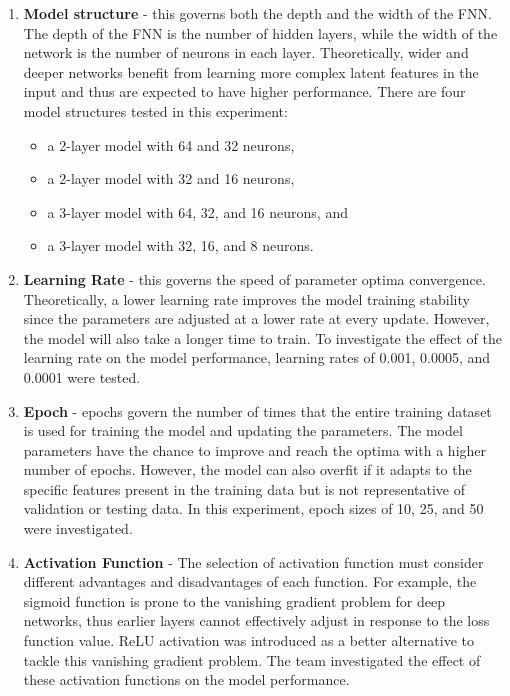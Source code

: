 \documentclass[a4paper]{article}
\begin{document}
\begin{enumerate}
    \item \textbf{Model structure} - this governs both the depth and the width of the FNN. The depth of the FNN is the number of hidden layers, while the width of the network is the number of neurons in each layer. Theoretically, wider and deeper networks benefit from learning more complex latent features in the input and thus are expected to have higher performance. There are four model structures tested in this experiment:
    \begin{itemize}
        \item a 2-layer model with 64 and 32 neurons,
        \item a 2-layer model with 32 and 16 neurons,
        \item a 3-layer model with 64, 32, and 16 neurons, and
        \item a 3-layer model with 32, 16, and 8 neurons.
    \end{itemize}
    \item \textbf{Learning Rate} - this governs the speed of parameter optima convergence. Theoretically, a lower learning rate improves the model training stability since the parameters are adjusted at a lower rate at every update. However, the model will also take a longer time to train. To investigate the effect of the learning rate on the model performance, learning rates of 0.001, 0.0005, and 0.0001 were tested.
    \newpage
    \item \textbf{Epoch} - epochs govern the number of times that the entire training dataset is used for training the model and updating the parameters. The model parameters have the chance to improve and reach the optima with a higher number of epochs. However, the model can also overfit if it adapts to the specific features present in the training data but is not representative of validation or testing data. In this experiment, epoch sizes of 10, 25, and 50 were investigated.
    \item \textbf{Activation Function} - The selection of activation function must consider different advantages and disadvantages of each function. For example, the sigmoid function is prone to the vanishing gradient problem for deep networks, thus earlier layers cannot effectively adjust in response to the loss function value. ReLU activation was introduced as a better alternative to tackle this vanishing gradient problem. The team investigated the effect of these activation functions on the model performance.
\end{enumerate}
\end{document}

